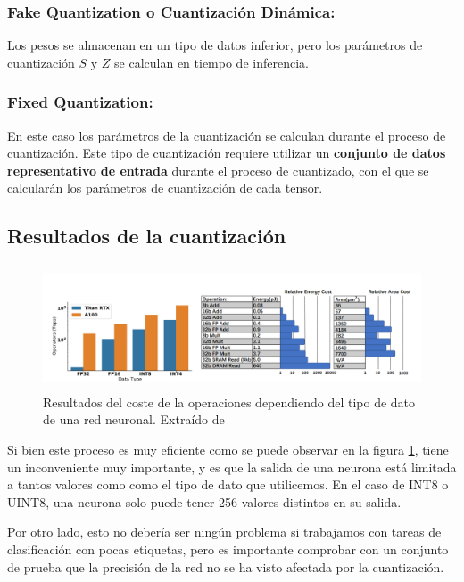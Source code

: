 \subsubsection{Fake Quantization o Cuantización Dinámica:}
Los pesos se almacenan en un tipo de datos inferior, pero los parámetros
de cuantización $S$ y $Z$ se calculan en tiempo de inferencia.
\subsubsection{Fixed Quantization:}
En este caso los parámetros de la cuantización se calculan durante el
proceso de cuantización. Este tipo de cuantización requiere utilizar un
\textbf{conjunto de datos representativo} \textbf{de entrada} durante el
proceso de cuantizado, con el que se calcularán los parámetros de
cuantización de cada tensor.

\hypertarget{resultados-de-la-cuantizaciuxf3n}{%
\subsection{Resultados de la
cuantización}\label{resultados-de-la-cuantizaciuxf3n}}
\begin{figure}
    \centering
    \includegraphics[width=5in,height=1.45833in]{img/3/quant_res.png}
    \caption{Resultados del coste de la operaciones dependiendo del tipo de dato de una red neuronal. Extraído de \cite{quant_survey}}
    \label{fig:quant-res}
\end{figure}

Si bien este proceso es muy eficiente como se puede observar en la figura \ref{fig:quant-res}, tiene un inconveniente muy
importante, y es que la salida de una neurona está limitada a tantos
valores como como el tipo de dato que utilicemos. En el caso de INT8 o UINT8, una neurona solo puede tener 256 valores distintos en su salida.

Por otro lado, esto no debería ser ningún problema si trabajamos con
tareas de clasificación con pocas etiquetas, pero es importante comprobar con un conjunto de
prueba que la precisión de la red no se ha visto afectada por la
cuantización.


